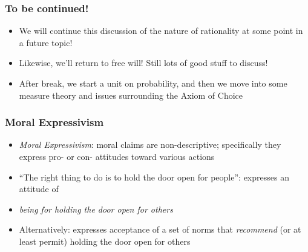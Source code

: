 \begin{frame}
\frametitle{To be continued! }

\begin{itemize}[<+->]

\item We will continue this discussion of the nature of rationality at some point in a future topic!

\item Likewise, we'll return to free will! Still lots of good stuff to discuss! 

\item After break, we start a unit on probability, and then we move into some measure theory and issues surrounding the Axiom of Choice

\end{itemize}
\end{frame}


\iffalse %

\begin{frame}
\frametitle{Moral Expressivism}

\begin{itemize}[<+->]

\item \emph{Moral Expressivism}: moral claims are non-descriptive; specifically they express pro- or con- attitudes toward various actions

\item ``The right thing to do is to hold the door open for people'': expresses an attitude of

\item[]  \textit{being for holding the door open for others} 

\item Alternatively: expresses acceptance of a set of norms that \textit{recommend} (or at least permit) holding the door open for others

\end{itemize}
\end{frame}

